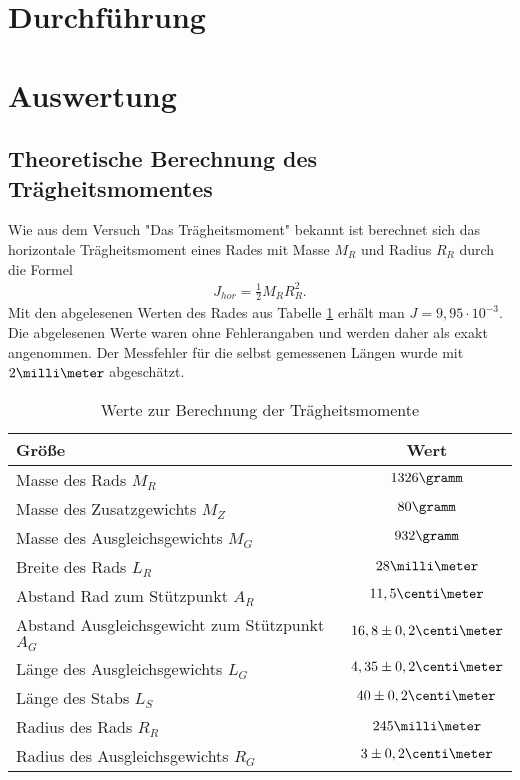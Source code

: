 \documentclass[12pt, a4paper, twoside]{scrartcl}
\begin{document}
\section{Durchführung}
\label{sec:durchfuehrung}



\section{Auswertung}
\label{sec:auswertung}
\subsection{Theoretische Berechnung des Trägheitsmomentes}

Wie aus dem Versuch "Das Trägheitsmoment" bekannt ist berechnet sich das horizontale Trägheitsmoment eines Rades mit Masse $M_R$ und Radius $R_R$ durch die Formel
\begin{align*}
J_{hor}=\frac{1}{2}M_RR_R^2.
\end{align*}
Mit den abgelesenen Werten des Rades aus Tabelle \ref{tab:datenrad} erhält man $J=9,95\cdot10^{-3}$. Die abgelesenen Werte waren ohne Fehlerangaben und werden daher als exakt angenommen. Der Messfehler für die selbst gemessenen Längen wurde mit $2\milli\meter$ abgeschätzt.

\renewcommand{\arraystretch}{1.2}
\begin{table}[H]
\centering
\begin{tabular}{|l|c||}
	\hline
    Größe & Wert  \\
    \hline\hline
    Masse des Rads $M_R$ & $1326\gramm$  \\
    \hline
    Masse des Zusatzgewichts $M_Z$ & $80\gramm $  \\
    \hline
    Masse des Ausgleichsgewichts $M_G$ & $932\gramm$  \\
    \hline
    Breite des Rads $L_R$ & $28\milli\meter$  \\
    \hline
    Abstand Rad zum Stützpunkt $A_R$ & $11,5\centi\meter $  \\
    \hline
    Abstand Ausgleichsgewicht zum Stützpunkt $A_G$ & $16,8\pm0,2\centi\meter $  \\
    \hline
    Länge des Ausgleichsgewichts $L_G$ & $4,35\pm0,2\centi\meter $  \\
    \hline
    Länge des Stabs $L_S$ & $40\pm0,2\centi\meter $  \\
    \hline	
    Radius des Rads $R_R$ & $245\milli\meter$  \\
    \hline
    Radius des Ausgleichsgewichts $R_G$ & $3\pm0,2\centi\meter$  \\
    \hline
 \end{tabular} 
 \caption{\label{tab:datenrad}Werte  zur Berechnung der Trägheitsmomente}
\end{table}
\end{document}

